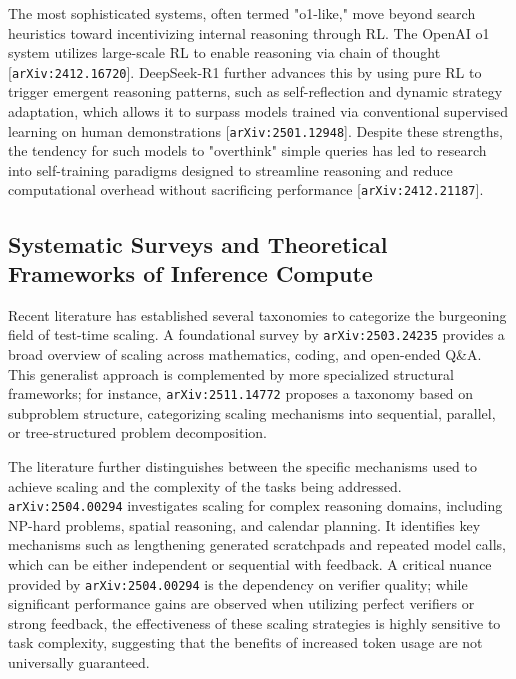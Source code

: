 \documentclass[11pt]{article}
\begin{document}
The most sophisticated systems, often termed "o1-like," move beyond search heuristics toward incentivizing internal reasoning through RL. The OpenAI o1 system utilizes large-scale RL to enable reasoning via chain of thought [\texttt{arXiv:2412.16720}]. DeepSeek-R1 further advances this by using pure RL to trigger emergent reasoning patterns, such as self-reflection and dynamic strategy adaptation, which allows it to surpass models trained via conventional supervised learning on human demonstrations [\texttt{arXiv:2501.12948}]. Despite these strengths, the tendency for such models to "overthink" simple queries has led to research into self-training paradigms designed to streamline reasoning and reduce computational overhead without sacrificing performance [\texttt{arXiv:2412.21187}].

\subsection{Systematic Surveys and Theoretical Frameworks of Inference Compute}

Recent literature has established several taxonomies to categorize the burgeoning field of test-time scaling. A foundational survey by \texttt{arXiv:2503.24235} provides a broad overview of scaling across mathematics, coding, and open-ended Q\&A. This generalist approach is complemented by more specialized structural frameworks; for instance, \texttt{arXiv:2511.14772} proposes a taxonomy based on subproblem structure, categorizing scaling mechanisms into sequential, parallel, or tree-structured problem decomposition.

The literature further distinguishes between the specific mechanisms used to achieve scaling and the complexity of the tasks being addressed. \texttt{arXiv:2504.00294} investigates scaling for complex reasoning domains, including NP-hard problems, spatial reasoning, and calendar planning. It identifies key mechanisms such as lengthening generated scratchpads and repeated model calls, which can be either independent or sequential with feedback. A critical nuance provided by \texttt{arXiv:2504.00294} is the dependency on verifier quality; while significant performance gains are observed when utilizing perfect verifiers or strong feedback, the effectiveness of these scaling strategies is highly sensitive to task complexity, suggesting that the benefits of increased token usage are not universally guaranteed.
\end{document}
